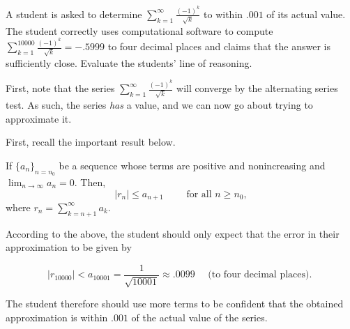 \documentclass{ximera}
\author{Jim Talamo}
\begin{document}
\begin{problem}
A student is asked to determine $\sum_{k=1}^{\infty} \frac{(-1)^k}{\sqrt{k}}$ to within $.001$ of its actual value.  The student correctly uses computational software to compute $\sum_{k=1}^{10000} \frac{(-1)^k}{\sqrt{k}} = -.5999$ to four decimal places and claims that the answer is sufficiently close.  Evaluate the students' line of reasoning.

\begin{freeResponse}
First, note that the series $\sum_{k=1}^{\infty} \frac{(-1)^k}{\sqrt{k}}$ will converge by the alternating series test.  As such, the series \emph{has} a value, and we can now go about trying to approximate it.  

First, recall the important result below.

\begin{theorem}
If $\{a_n\}_{n=n_0}$ be a sequence whose terms are positive and nonincreasing  and
$\lim_{n\to\infty} a_n=0$. Then,  
\[
\big| r_n \big| \leq a_{n+1} \qquad \textrm{ for all } n \geq n_0,
\]
where $r_n = \sum_{k=n+1}^{\infty} a_k$.
\end{theorem}

According to the above, the student should only expect that the error in their approximation to be given by

\[
\big|r_{10000}\big| < a_{10001} = \frac{1}{\sqrt{10001}} \approx .0099 \quad \textrm{ (to four decimal places). }
\]

The student therefore should use more terms to be confident that the obtained approximation is within $.001$ of the actual value of the series. 
\end{freeResponse}

\end{problem}
\end{document}
